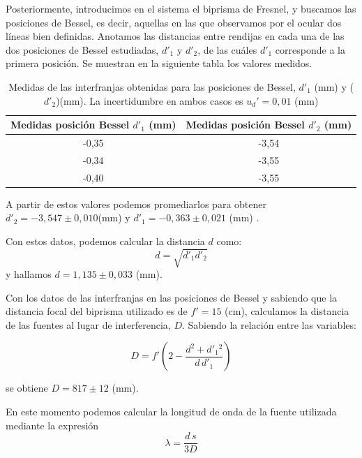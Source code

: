 \documentclass[10pt,onecolumn]{article}
\begin{document}
Posteriormente, introducimos en el sistema el biprisma de Fresnel, y buscamos las posiciones de Bessel, es decir, aquellas en las que observamos por el ocular dos líneas bien definidas.
Anotamos las distancias entre rendijas en cada una de las dos posiciones de Bessel estudiadas, $d'_1$ y $d'_2$, de las cuáles $d'_1$ corresponde a la primera posición. Se muestran en la siguiente tabla los valores medidos.
\begin{table}[H]
\centering
\begin{tabular}{|c|c|}
\hline
\rowcolor[rgb]{ .651,  .788,  .925}
\textbf{Medidas posición Bessel $d'_1$ (mm)} & \textbf{Medidas posición Bessel $d'_2$ (mm)} \\ \hline
\rowcolor[rgb]{.816,  .816,  .816} -0,35 & -3,54 \\ \hline
\rowcolor[rgb]{.816,  .816,  .816} -0,34 & -3,55 \\ \hline
\rowcolor[rgb]{.816,  .816,  .816} -0,40 & -3,55 \\ \hline
\end{tabular}
\caption{Medidas de las interfranjas obtenidas para las posiciones de Bessel, $d'_1$ (mm) y ($d'_2$)(mm). La incertidumbre en ambos casos es $u_d'=0,01$ (mm)}
\label{tab:franjas_cerca_lejos}
\end{table}

A partir de estos valores podemos promediarlos para obtener $d'_2= -3,547\pm 0,010$(mm) y $d'_1= -0,363\pm 0,021$ (mm) .

Con estos datos, podemos calcular la distancia $d$ como:
\begin{equation}
d = \sqrt{d'_{1} d'_{2}}
\end{equation}
y hallamos $d=1,135 \pm 0,033$ (mm).

Con los datos de las interfranjas en las posiciones de Bessel y sabiendo que la distancia focal del biprisma utilizado es de $f' = 15$ (cm), calculamos la distancia de las fuentes al lugar de interferencia, $D$. 
Sabiendo la relación entre las variables:

\begin{equation}
D = f' \left( 2 - \frac{d^{2} + d'_{1}{}^{2}}{d\, d'_{1}} \right)
\end{equation}

se obtiene $D=817 \pm 12$ (mm).

En este momento podemos calcular la longitud de onda de la fuente utilizada mediante la expresión
\begin{equation}
\lambda = \frac{d \, s}{3D}
\end{equation}
\end{document}
